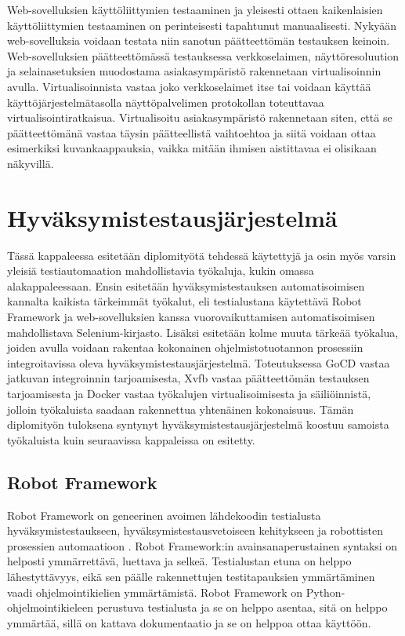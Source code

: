   Web-sovelluksien käyttöliittymien testaaminen ja yleisesti ottaen kaikenlaisien käyttöliittymien testaaminen on perinteisesti tapahtunut manuaalisesti.
  Nykyään web-sovelluksia voidaan testata niin sanotun päätteettömän testauksen keinoin.
  Web-sovelluksien päätteettömässä testauksessa verkkoselaimen, näyttöresoluution ja selainasetuksien muodostama asiakasympäristö rakennetaan virtualisoinnin avulla.
  Virtualisoinnista vastaa joko verkkoselaimet itse tai voidaan käyttää käyttöjärjestelmätasolla näyttöpalvelimen protokollan toteuttavaa virtualisointiratkaisua.
  Virtualisoitu asiakasympäristö rakennetaan siten, että se päätteettömänä vastaa täysin päätteellistä vaihtoehtoa ja siitä voidaan ottaa esimerkiksi kuvankaappauksia, vaikka mitään ihmisen aistittavaa ei olisikaan näkyvillä.

\section{Hyväksymistestausjärjestelmä} \label{ch:08_hyvaksymistestausjarjestelma}

  Tässä kappaleessa esitetään diplomityötä tehdessä käytettyjä ja osin myös varsin yleisiä testiautomaation mahdollistavia työkaluja, kukin omassa alakappaleessaan.
  Ensin esitetään hyväksymistestauksen automatisoimisen kannalta kaikista tärkeimmät työkalut, eli testialustana käytettävä Robot Framework ja web-sovelluksien kanssa vuorovaikuttamisen automatisoimisen mahdollistava Selenium-kirjasto.
  Lisäksi esitetään kolme muuta tärkeää työkalua, joiden avulla voidaan rakentaa kokonainen ohjelmistotuotannon prosessiin integroitavissa oleva hyväksymistestausjärjestelmä.
  Toteutuksessa GoCD vastaa jatkuvan integroinnin tarjoamisesta, Xvfb vastaa päätteettömän testauksen tarjoamisesta ja Docker vastaa työkalujen virtualisoimisesta ja säiliöinnistä, jolloin työkaluista saadaan rakennettua yhtenäinen kokonaisuus.
  Tämän diplomityön tuloksena syntynyt hyväksymistestausjärjestelmä koostuu samoista työkaluista kuin seuraavissa kappaleissa on esitetty.

  \subsection{Robot Framework} \label{ch:08_robot_framework}

    Robot Framework on geneerinen avoimen lähdekoodin testialusta hyväksymistestaukseen, hyväksymistestausvetoiseen kehitykseen ja robottisten prosessien automaatioon \parencite{robot_framework_info}.
    Robot Framework:in avainsanaperustainen syntaksi on helposti ymmärrettävä, luettava ja selkeä.
    Testialustan etuna on helppo lähestyttävyys, eikä sen päälle rakennettujen testitapauksien ymmärtäminen vaadi ohjelmointikielien ymmärtämistä.
    Robot Framework on Python-ohjelmointikieleen perustuva testialusta ja se on helppo asentaa, sitä on helppo ymmärtää, sillä on kattava dokumentaatio ja se on helppoa ottaa käyttöön.

